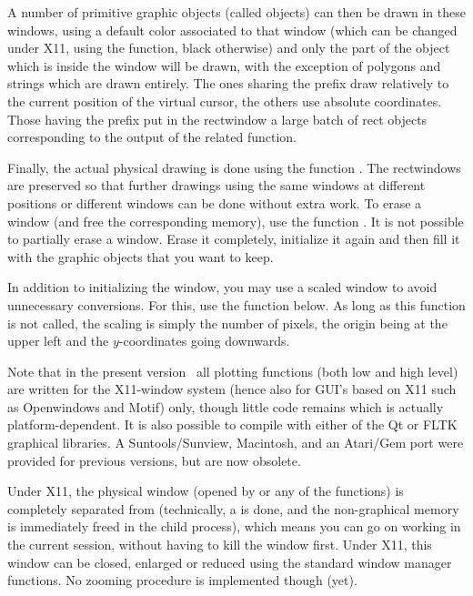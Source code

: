 A number of primitive graphic objects (called  objects) can then
be drawn in these windows, using a default color associated to that window
(which can be changed under X11, using the  function, black
otherwise) and only the part of the object which is inside the window will be
drawn, with the exception of polygons and strings which are drawn entirely.
The ones sharing the prefix  draw relatively to the current
position of the virtual cursor, the others use absolute coordinates. Those
having the prefix  put in the rectwindow a large batch of rect
objects corresponding to the output of the related  function.

   Finally, the actual physical drawing is done using the function
. The rectwindows are preserved so that further drawings
using the same windows at different positions or different windows can be
done without extra work. To erase a window (and free the corresponding
memory), use the function . It is not possible to partially
erase a window. Erase it completely, initialize it again and then fill it with
the graphic objects that you want to keep.

   In addition to initializing the window, you may use a scaled
window to avoid unnecessary conversions. For this, use the function
 below. As long as this function is not called, the scaling is
simply the number of pixels, the origin being at the upper left and the
$y$-coordinates going downwards.

   Note that in the present version \vers\ all plotting functions (both low
and high level) are written for the X11-window system (hence also for GUI's
based on X11 such as Openwindows and Motif) only, though little code
remains which is actually platform-dependent. It is also possible to compile
 with either of the Qt or FLTK graphical libraries. A
Suntools/Sunview, Macintosh, and an Atari/Gem port were provided for previous
versions, but are now obsolete.

   Under X11, the physical window (opened by  or any of the
 functions) is completely separated from  (technically, a
 is done, and the non-graphical memory is immediately freed in the
child process), which means you can go on working in the current 
session, without having to kill the window first. Under X11, this window can
be closed, enlarged or reduced using the standard window manager functions.
No zooming procedure is implemented though (yet).

